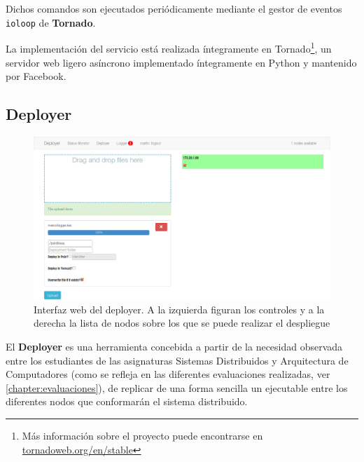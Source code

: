 Dichos comandos son ejecutados periódicamente mediante el gestor de eventos \texttt{ioloop} de \textbf{Tornado}.

La implementación del servicio está realizada íntegramente en Tornado\footnote{Más información sobre el proyecto puede encontrarse en \href{http://www.tornadoweb.org/en/stable/}{tornadoweb.org/en/stable}}, un servidor web ligero asíncrono implementado íntegramente en Python y mantenido por Facebook.

\subsection{Deployer}

\begin{figure}[H]
\centering
\includegraphics[height=0.3\textheight]{Chapters/Chapter5/Figures/screenshot-deployer}
\caption[Interfaz web del deployer]{Interfaz web del deployer. A la izquierda figuran los controles y a la derecha la lista de nodos sobre los que se puede realizar el despliegue}
\label{fig:vista_deployer}
\end{figure}

El \textbf{Deployer} es una herramienta concebida a partir de la necesidad observada entre los estudiantes de las asignaturas Sistemas Distribuidos y Arquitectura de Computadores (como se refleja en las diferentes evaluaciones realizadas, ver \ref{chapter:evaluaciones}), de replicar de una forma sencilla un ejecutable entre los diferentes nodos que conformarán el sistema distribuido.

